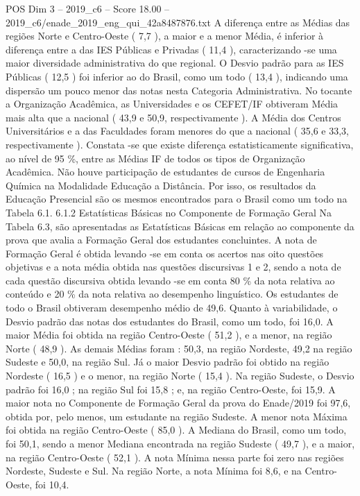 \begin{textsample}{POS Dim 3 – 2019\_c6 – Score 18.00 – 2019\_c6/enade\_2019\_eng\_qui\_42a8487876.txt}
A diferença entre as Médias das regiões Norte e Centro-Oeste ( 7,7 ), a maior e a menor Média, é inferior à diferença entre a das IES Públicas e Privadas ( 11,4 ), caracterizando -se uma maior diversidade administrativa do que regional.
O Desvio padrão para as IES Públicas ( 12,5 ) foi inferior ao do Brasil, como um todo ( 13,4 ), indicando uma dispersão um pouco menor das notas nesta Categoria Administrativa.
No tocante a Organização Acadêmica, as Universidades e os CEFET/IF obtiveram Média mais alta que a nacional ( 43,9 e 50,9, respectivamente ).
A Média dos Centros Universitários e a das Faculdades foram menores do que a nacional ( 35,6 e 33,3, respectivamente ).
Constata -se que existe diferença estatisticamente significativa, ao nível de 95 \%, entre as Médias IF de todos os tipos de Organização Acadêmica.
Não houve participação de estudantes de cursos de Engenharia Química na Modalidade Educação a Distância.
Por isso, os resultados da Educação Presencial são os mesmos encontrados para o Brasil como um todo na Tabela 6.1. 6.1.2 Estatísticas Básicas no Componente de Formação Geral Na Tabela 6.3, são apresentadas as Estatísticas Básicas em relação ao componente da prova que avalia a Formação Geral dos estudantes concluintes.
A nota de Formação Geral é obtida levando -se em conta os acertos nas oito questões objetivas e a nota média obtida nas questões discursivas 1 e 2, sendo a nota de cada questão discursiva obtida levando -se em conta 80 \% da nota relativa ao conteúdo e 20 \% da nota relativa ao desempenho linguístico.
Os estudantes de todo o Brasil obtiveram desempenho médio de 49,6.
Quanto à variabilidade, o Desvio padrão das notas dos estudantes do Brasil, como um todo, foi 16,0.
A maior Média foi obtida na região Centro-Oeste ( 51,2 ), e a menor, na região Norte ( 48,9 ).
As demais Médias foram : 50,3, na região Nordeste, 49,2 na região Sudeste e 50,0, na região Sul.
Já o maior Desvio padrão foi obtido na região Nordeste ( 16,5 ) e o menor, na região Norte ( 15,4 ).
Na região Sudeste, o Desvio padrão foi 16,0 ; na região Sul foi 15,8 ; e, na região Centro-Oeste, foi 15,9.
A maior nota no Componente de Formação Geral da prova do Enade/2019 foi 97,6, obtida por, pelo menos, um estudante na região Sudeste.
A menor nota Máxima foi obtida na região Centro-Oeste ( 85,0 ).
A Mediana do Brasil, como um todo, foi 50,1, sendo a menor Mediana encontrada na região Sudeste ( 49,7 ), e a maior, na região Centro-Oeste ( 52,1 ).
A nota Mínima nessa parte foi zero nas regiões Nordeste, Sudeste e Sul.
Na região Norte, a nota Mínima foi 8,6, e na Centro-Oeste, foi 10,4.

\end{textsample}
